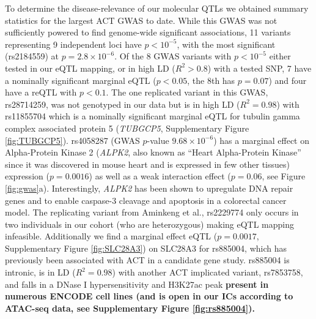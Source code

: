 \documentclass{article}
\newcommand{\tempbold}[1]{\textbf{#1}}
\begin{document}
To determine the disease-relevance of our molecular QTLs we obtained summary statistics for the largest ACT GWAS to date\cite{Schneider2016}. While this GWAS was not sufficiently powered to find genome-wide significant associations, 11 variants representing 9 independent loci have $p<10^{-5}$, with the most significant (rs2184559) at $p=2.8 \times 10^{-6}$. Of the 8 GWAS variants with $p<10^{-5}$ either tested in our eQTL mapping, or in high LD ($R^2 > 0.8$) with a tested SNP, 7 have a nominally significant marginal eQTL ($p<0.05$, the 8th has $p=0.07$) and four have a reQTL with $p<0.1$. The one replicated variant in this GWAS, rs28714259, was not genotyped in our data but is in high LD ($R^2=0.98$) with rs11855704 which is a nominally significant marginal eQTL for tubulin gamma complex associated protein 5 (\emph{TUBGCP5}, Supplementary Figure \ref{fig:TUBGCP5}). rs4058287 (GWAS $p$-value $9.68\times 10^{-6}$) has a marginal effect on Alpha-Protein Kinase 2 (\emph{ALPK2}, also known as ``Heart Alpha-Protein Kinase'' since it was discovered in mouse heart\cite{ryazanov1999alpha} and is expressed in few other tissues\cite{Mele2015-sc}) expression ($p=0.0016$) as well as a weak interaction effect ($p=0.06$, see Figure \ref{fig:gwas}a). Interestingly, \emph{ALPK2} has been shown to upregulate DNA repair genes and to enable caspase-3 cleavage and apoptosis in a colorectal cancer model\citep{yoshida2012alpk2}. The replicating variant from Aminkeng et al.\cite{Aminkeng2015}, rs2229774 only occurs in two individuals in our cohort (who are heterozygous) making eQTL mapping infeasible. Additionally we find a marginal effect eQTL ($p=0.0017$, Supplementary Figure \ref{fig:SLC28A3}) on SLC28A3 for rs885004, which has previously been associated with ACT in a candidate gene study\cite{Visscher2013-zs}. rs885004 is intronic, is in LD ($R^2=0.98$) with another ACT implicated variant, rs7853758\cite{Visscher2012-xl}, and falls in a DNase I hypersensitivity and H3K27ac peak \tempbold{present in numerous ENCODE cell lines (and is open in our ICs according to ATAC-seq data, see Supplementary Figure \ref{fig:rs885004}).}
\end{document}
